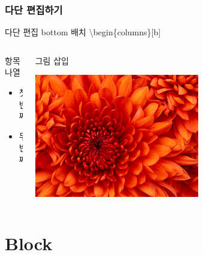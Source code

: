 \documentclass[10pt,xcolor=pdftex,dvipsnames,table,handout]{beamer}
\begin{document}
		\begin{frame}[t]
		\frametitle{다단 편집하기}

			\begin{example} {다단 편집 bottom 배치}
			\textbackslash begin\{columns\}[b]
			\end{example}

		\begin{columns}[b]
		\begin{column}{.5\textwidth}

			\begin{block} {항목 나열}
			\begin{itemize}
			\item 첫 번째
			\item 두 번째
			\end{itemize}
			\end{block}

		\end{column}

		\begin{column}{.4\textwidth}

			\begin{block} {그림 삽입}
			\centerline{\includegraphics[scale=1.0,width=0.6\textwidth]{./fig/Chrysanthemum.jpg}}
			\end{block}

		\end{column}
		\end{columns}
		\end{frame}





		\section{Block}
\end{document}
